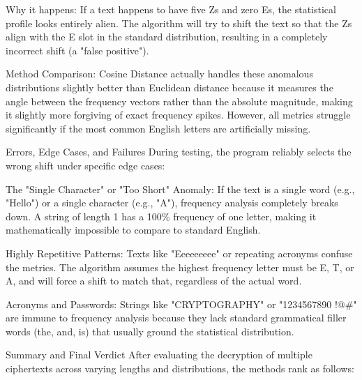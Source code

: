 Why it happens:\+ If a text happens to have five \textquotesingle{}Z\textquotesingle{}s and zero \textquotesingle{}E\textquotesingle{}s, the statistical profile looks entirely alien. The algorithm will try to shift the text so that the \textquotesingle{}Z\textquotesingle{}s align with the \textquotesingle{}E\textquotesingle{} slot in the standard distribution, resulting in a completely incorrect shift (a "{}false positive"{}).

Method Comparison:\+ Cosine Distance actually handles these anomalous distributions slightly better than Euclidean distance because it measures the angle between the frequency vectors rather than the absolute magnitude, making it slightly more forgiving of exact frequency spikes. However, all metrics struggle significantly if the most common English letters are artificially missing.


\begin{DoxyEnumerate}
\item Errors, Edge Cases, and Failures During testing, the program reliably selects the wrong shift under specific edge cases:\+
\end{DoxyEnumerate}

The "{}\+Single Character"{} or "{}\+Too Short"{} Anomaly:\+ If the text is a single word (e.\+g., "{}\+Hello"{}) or a single character (e.\+g., "{}\+A"{}), frequency analysis completely breaks down. A string of length 1 has a 100\% frequency of one letter, making it mathematically impossible to compare to standard English.

Highly Repetitive Patterns:\+ Texts like "{}\+Eeeeeeeee"{} or repeating acronyms confuse the metrics. The algorithm assumes the highest frequency letter must be \textquotesingle{}E\textquotesingle{}, \textquotesingle{}T\textquotesingle{}, or \textquotesingle{}A\textquotesingle{}, and will force a shift to match that, regardless of the actual word.

Acronyms and Passwords:\+ Strings like "{}\+CRYPTOGRAPHY"{} or "{}1234567890 !@\+\#"{} are immune to frequency analysis because they lack standard grammatical filler words (the, and, is) that usually ground the statistical distribution.


\begin{DoxyEnumerate}
\item Summary and Final Verdict After evaluating the decryption of multiple ciphertexts across varying lengths and distributions, the methods rank as follows:\+
\end{DoxyEnumerate}

